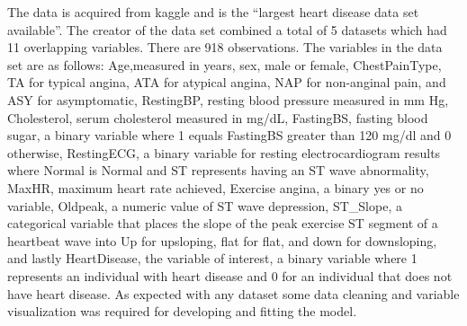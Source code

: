\documentclass[12pt]{article}
\begin{document}
The data is acquired from kaggle and is the “largest heart disease data set available”. The creator of the data set combined a total of 5 datasets which had 11 overlapping variables. There are 918 observations. The variables in the data set are as follows: Age,measured in years, sex, male or female, ChestPainType, TA for typical angina, ATA for atypical angina, NAP for non-anginal pain, and ASY for asymptomatic, RestingBP, resting blood pressure measured in mm Hg, Cholesterol, serum cholesterol measured in mg/dL, FastingBS, fasting blood sugar, a binary variable where 1 equals FastingBS greater than 120 mg/dl and 0 otherwise, RestingECG, a binary variable for resting electrocardiogram results where Normal is Normal and ST represents having an ST wave abnormality, MaxHR, maximum heart rate achieved, Exercise angina, a binary yes or no variable, Oldpeak, a numeric value of ST wave depression, ST_Slope, a categorical variable that places the slope of the peak exercise ST segment of a heartbeat wave into Up for upsloping, flat for flat, and down for downsloping, and lastly HeartDisease, the variable of interest, a binary variable where 1 represents an individual with heart disease and 0 for an individual that does not have heart disease. As expected with any dataset some data cleaning and variable visualization was required for developing and fitting the model.
\end{document}
